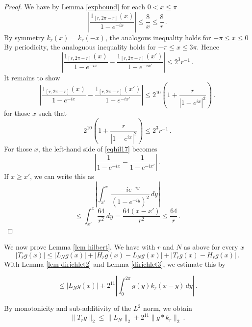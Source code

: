\begin{proof}
We have by Lemma \ref{expbound} for each $0<x\le \pi$
\begin{equation}
    |\frac{1_{[r, 2\pi -r]}(x)}{1-e^{-ix}}|\le \frac 8x\le \frac 8r\, .
\end{equation}
By symmetry $k_r(x)=k_r(-x)$, the analogous inequality holds for $-\pi \le x\le 0$
By periodicity, the analoguous inequality holds for $-\pi\le x\le 3\pi$.
Hence
\begin{equation}\label{eqhil16}
    |\frac{1_{[r, 2\pi -r]}(x)}{1-e^{-ix}}-\frac{1_{[r, 2\pi -r]}(x')}{1-e^{-ix'}}|\le 2^{3}r^{-1}\, .
\end{equation}
It remains to show
\begin{equation}\label{eqhil17}
    |\frac{1_{[r, 2\pi -r]}(x)}{1-e^{-ix}}-\frac{1_{[r, 2\pi -r]}(x')}{1-e^{-ix'}}|\le 2^{10}\left(1+\frac{r}{|1-e^{ix}|^2}\right)\, .
\end{equation}
for those $x$ such that
\begin{equation}\label{eqhil15}
    2^{10}\left(1+\frac{r}{|1-e^{ix}|^2}\right)\le 2^{3}r^{-1}\, .
\end{equation}
    For those $x$, the left-hand side  of \eqref{eqhil17} becomes
    \begin{equation}
    |\frac{1}{1-e^{-ix}}-\frac{1}{1-e^{-ix'}}|\, .
\end{equation}
If $x\ge x'$, we can write this as
\begin{equation*}
    |\int_{x'}^x \frac{-ie^{-iy}}{(1-e^{-iy})^2}\, dy|
\end{equation*}
\begin{equation}
    \le \int_{x'}^x \frac{64}{r^2}\, dy=\frac{64(x-x')}{r^2}\le \frac{64}r\, .
\end{equation}


\end{proof}

We now prove Lemma \ref{lem hilbert}.
We have with $r$ and $N$ as above for every $x$
\begin{equation}
|T_rg(x)|\le |L_Ng(x)|+ |H_rg(x)-L_Ng(x)|+ |T_rg(x)-H_rg(x)|\, .
\end{equation}
With Lemma \ref{lem dirichlet2} and Lemma \ref{dirichlet3}, we estimate this by

\begin{equation}
\le |L_Ng(x)|+ 2^{11}|\int_0^{2\pi} g(y) k_r(x-y)\, dy|\, .
\end{equation}

By monotonicity and sub-additivity of the $L^2$ norm, we obtain
\begin{equation}
    \|T_rg\|_2\le \|L_N\|_2+2^{11}\|g*k_r\|_2\ .
\end{equation}

